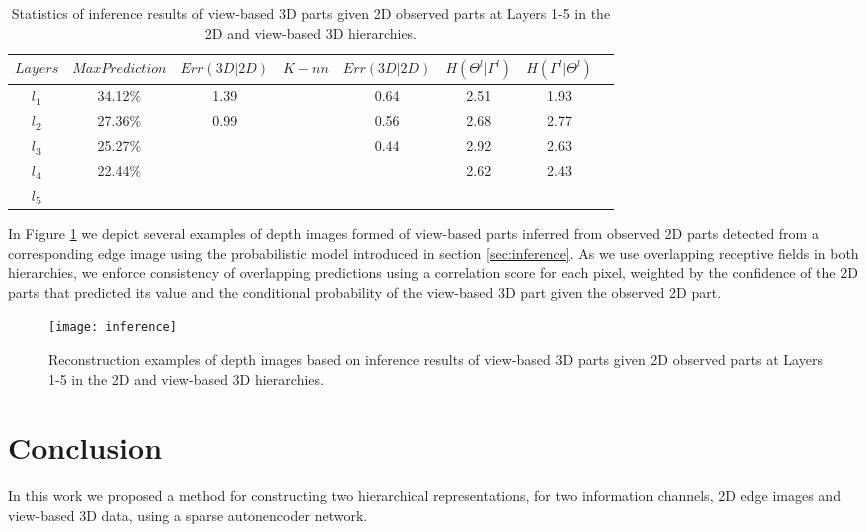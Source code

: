 \documentclass[runningheads]{llncs}
\begin{document}
 \begin{table}
 \begin{center}
  \begin{tabular}{ | c | c | c | c | c | c | c |r |}
      \hline
      $Layers$  & $Max Prediction$ & $Err(3D|2D)$ & $K-nn$ & $Err(3D|2D)$ & $H(\Theta^l|\Gamma^l)$ & $H(\Gamma^l|\Theta^l)$  \\ \hline
    $l_1$ &  34.12\% & 1.39 &  & 0.64 & 2.51 & 1.93 \\ \hline
    $l_2$ &  27.36\% & 0.99 &  & 0.56 & 2.68 & 2.77 \\ \hline
    $l_3$ &  25.27\% &  &  & 0.44 & 2.92 & 2.63 \\ \hline 
    $l_4$ &  22.44\% &  &  &  & 2.62 & 2.43 \\ \hline
    $l_5$ &   &  &  &  &  &  \\ 
    \hline
  \end{tabular}
\end{center}
\caption{Statistics of inference results of view-based 3D parts given 2D observed parts at Layers 1-5 in the 2D and view-based 3D hierarchies.}
\end{table}

In Figure \ref{inference} we depict several examples of depth images formed of view-based parts inferred from observed 2D parts detected from a corresponding edge image using the probabilistic model introduced in section \ref{sec:inference}. As we use overlapping receptive fields in both hierarchies, we enforce consistency of overlapping predictions using a correlation score for each pixel, weighted by the confidence of the 2D parts that predicted its value and the conditional probability of the view-based 3D part given the observed 2D part.

\begin{figure}
\begin{center}
\texttt{[image: inference]}
\end{center}
\caption{Reconstruction examples of depth images based on inference results of view-based 3D parts given 2D observed parts at Layers 1-5 in the 2D and view-based 3D hierarchies.}
\label{inference}
\end{figure}

\section{Conclusion}
 
In this work we proposed a method for constructing two hierarchical representations, for two information channels, 2D edge images and view-based 3D data, using a sparse autonencoder network. 
\end{document}

